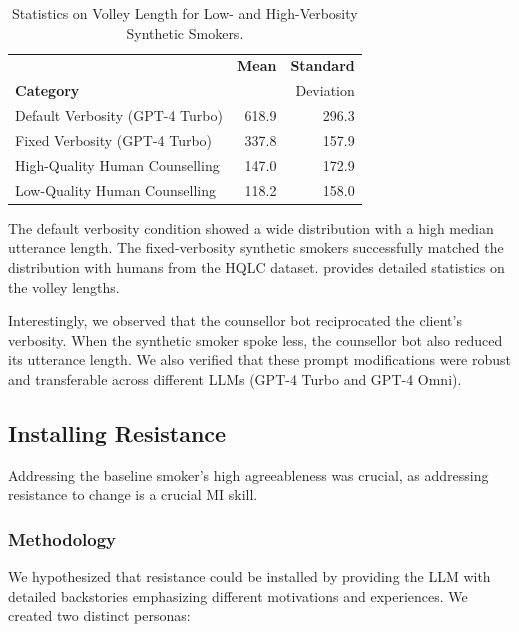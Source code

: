 \begin{table}[ht]
	\centering

	\begin{tabular}{lrr}
		\toprule
		{}                              & \textbf{Mean} & \textbf{Standard} \\
		\textbf{Category}               &               & {Deviation}       \\
		\midrule
		Default Verbosity (GPT-4 Turbo) & 618.9         & 296.3             \\
		Fixed Verbosity (GPT-4 Turbo)   & 337.8         & 157.9             \\
		High-Quality Human Counselling  & 147.0         & 172.9             \\
		Low-Quality Human Counselling   & 118.2         & 158.0             \\
		\bottomrule
	\end{tabular}
	\caption{Statistics on Volley Length for Low- and High-Verbosity Synthetic Smokers.}
	\label{tab:utterance_stats}
\end{table}

The default verbosity condition showed a wide distribution with a high median utterance
length. The fixed-verbosity synthetic smokers successfully matched the distribution
with humans from the HQLC dataset.  provides detailed
statistics on the volley lengths.

Interestingly, we observed that the counsellor bot reciprocated the client's verbosity.
When the synthetic smoker spoke less, the counsellor bot also reduced its utterance
length. We also verified that these prompt modifications were robust and transferable
across different LLMs (GPT-4 Turbo and GPT-4 Omni).

\subsection{Installing Resistance}
\label{sec:synthetic-smoker-resistance}

Addressing the baseline smoker's high agreeableness was crucial, as addressing
resistance to change is a crucial MI skill.

\subsubsection{Methodology}
We hypothesized that resistance could be installed by providing the LLM with detailed
backstories emphasizing different motivations and experiences. We created two distinct
personas:

